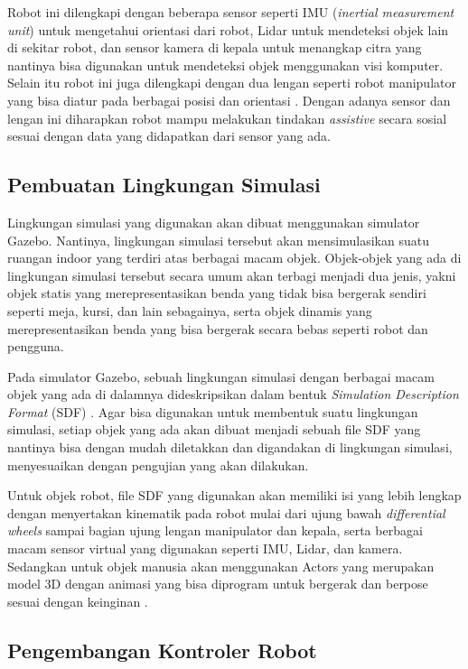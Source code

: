 Robot ini dilengkapi dengan beberapa sensor seperti IMU (\emph{inertial measurement unit}) untuk mengetahui orientasi dari robot, Lidar untuk mendeteksi objek lain di sekitar robot, dan sensor kamera di kepala untuk menangkap citra yang nantinya bisa digunakan untuk mendeteksi objek menggunakan visi komputer.
Selain itu robot ini juga dilengkapi dengan dua lengan seperti robot manipulator yang bisa diatur pada berbagai posisi dan orientasi \citep{Iqbal2012}.
Dengan adanya sensor dan lengan ini diharapkan robot mampu melakukan tindakan \emph{assistive} secara sosial sesuai dengan data yang didapatkan dari sensor yang ada.

\subsection{Pembuatan Lingkungan Simulasi}

Lingkungan simulasi yang digunakan akan dibuat menggunakan simulator Gazebo.
Nantinya, lingkungan simulasi tersebut akan mensimulasikan suatu ruangan indoor yang terdiri atas berbagai macam objek.
Objek-objek yang ada di lingkungan simulasi tersebut secara umum akan terbagi menjadi dua jenis, yakni objek statis yang merepresentasikan benda yang tidak bisa bergerak sendiri seperti meja, kursi, dan lain sebagainya, serta objek dinamis yang merepresentasikan benda yang bisa bergerak secara bebas seperti robot dan pengguna.

Pada simulator Gazebo, sebuah lingkungan simulasi dengan berbagai macam objek yang ada di dalamnya dideskripsikan dalam bentuk \emph{Simulation Description Format} (SDF) \citep{SdfFormat}.
Agar bisa digunakan untuk membentuk suatu lingkungan simulasi, setiap objek yang ada akan dibuat menjadi sebuah file SDF yang nantinya bisa dengan mudah diletakkan dan digandakan di lingkungan simulasi, menyesuaikan dengan pengujian yang akan dilakukan.

Untuk objek robot, file SDF yang digunakan akan memiliki isi yang lebih lengkap dengan menyertakan kinematik pada robot mulai dari ujung bawah \emph{differential wheels} sampai bagian ujung lengan manipulator dan kepala, serta berbagai macam sensor virtual yang digunakan seperti IMU, Lidar, dan kamera.
Sedangkan untuk objek manusia akan menggunakan Actors yang merupakan model 3D dengan animasi yang bisa diprogram untuk bergerak dan berpose sesuai dengan keinginan \citep{GazeboActors}.

\subsection{Pengembangan Kontroler Robot}

